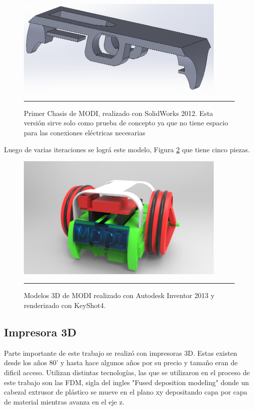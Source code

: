 \begin{figure}[htbp]
	\centering
		\includegraphics[width=0.9\textwidth]{./Figures/MODI/1MODI.jpg}
		\rule{35em}{0.5pt}
	\caption[ModiSolidWorks]{Primer Chasis de MODI, realizado con SolidWorks 2012. Esta versión sirve solo como prueba de concepto ya que no tiene espacio para las conexiones eléctricas necesarias}
	\label{fig:MODISolidWork}
\end{figure}	

Luego de varias iteraciones se lográ este modelo, Figura \ref{fig:render3} que tiene cinco piezas. 


\begin{figure}[htbp]
	\centering
		\includegraphics[width=0.9\textwidth]{./Figures/MODI/render3.jpg}
		\rule{35em}{0.5pt}
	\caption[Render modi]{Modelos 3D de MODI realizado con Autodesk Inventor 2013 y renderizado con KeyShot4. }
	\label{fig:render3}
\end{figure}	


\subsection{Impresora 3D} \label{cap:impresora3D}

Parte importante de este trabajo se realizó con impresoras 3D. Estas existen desde los años 80' y hasta hace algunos años por su precio y tamaño eran de dificil acceso. Utilizan distintas tecnologías, las que se utilizaron en el proceso de este trabajo son las FDM, sigla del ingles "Fused deposition modeling" donde un cabezal extrusor de plástico se mueve en el plano xy depositando capa por capa de material mientras avanza en el eje z.


